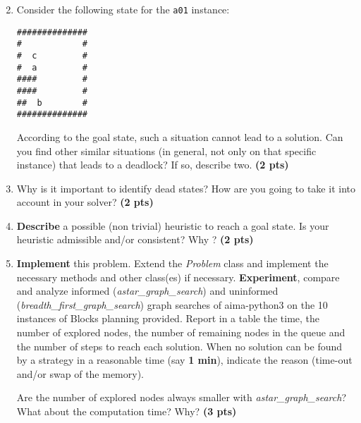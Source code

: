 \documentclass[11pt,a4paper]{report}
\begin{document}
\newpage
\begin{enumerate}
\setcounter{enumi}{1}
\item Consider the following state for the \texttt{a01} instance:
\begin{verbatim}	
##############
#            #
#  c         #
#  a         #
####         #
####         #
##  b        #
##############
\end{verbatim}
\normalsize
According to the goal state, such a situation cannot lead to a solution.
Can you find other similar situations (in general, not only on that specific instance) that leads to a deadlock? If so, describe two. \textbf{(2 pts)}
\end{enumerate}

\begin{answers}[5.5cm]
\end{answers}



\begin{enumerate}
\setcounter{enumi}{2}
\item Why is it important to identify dead states? How are you going to take it into account in your solver? \textbf{(2 pts)}
\end{enumerate}

\begin{answers}[3cm]
\end{answers}


\newpage
\begin{enumerate}
\setcounter{enumi}{3}
\item \textbf{Describe} a possible (non trivial) heuristic to reach a goal state. Is your heuristic admissible and/or consistent? Why ? \textbf{(2 pts)}
\end{enumerate}

\begin{answers}[4cm]
\end{answers}



\begin{enumerate}
\setcounter{enumi}{4}
\item \textbf{Implement} this problem. Extend the \emph{Problem} class and implement the necessary methods and other class(es) if necessary. \textbf{Experiment}, compare and analyze informed (\emph{astar\_graph\_search}) and uninformed (\emph{breadth\_first\_graph\_search}) graph searches of aima-python3 on the 10 instances of Blocks planning provided. Report in a table the time, the number of explored nodes, the number of remaining nodes in the queue and the number of steps to reach each solution. When no solution can be found by a strategy in a reasonable time (say \textbf{1 min}), indicate the reason (time-out and/or swap of the memory). 

Are the number of explored nodes always smaller with \emph{astar\_graph\_search}? What about the computation time? Why? \textbf{(3 pts)}
\end{enumerate}
\end{document}

